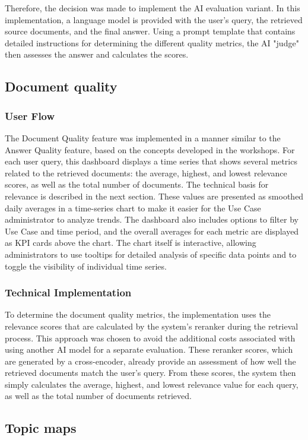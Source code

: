 \documentclass[
	english,
	ruledheaders=section,%
	class=report,%
	thesis={type=bachelor},%
	accentcolor=1b,%
	custommargins=true,%
	marginpar=false,%
	parskip=half-,%
	fontsize=11pt,%
	DIV=14,
]{tudapub}
\begin{document}
Therefore, the decision was made to implement the AI evaluation variant. In this implementation, a language model is provided with the user's query, the retrieved source documents, and the final answer. Using a prompt template that contains detailed instructions for determining the different quality metrics, the AI "judge" then assesses the answer and calculates the scores.
\subsection{Document quality}
\subsubsection{User Flow}
The Document Quality feature was implemented in a manner similar to the Answer Quality feature, based on the concepts developed in the workshops. For each user query, this dashboard displays a time series that shows several metrics related to the retrieved documents: the average, highest, and lowest relevance scores, as well as the total number of documents. The technical basis for relevance is described in the next section. These values are presented as smoothed daily averages in a time-series chart to make it easier for the Use Case administrator to analyze trends. The dashboard also includes options to filter by Use Case and time period, and the overall averages for each metric are displayed as KPI cards above the chart. The chart itself is interactive, allowing administrators to use tooltips for detailed analysis of specific data points and to toggle the visibility of individual time series.

\subsubsection{Technical Implementation}
To determine the document quality metrics, the implementation uses the relevance scores that are calculated by the system's reranker during the retrieval process. This approach was chosen to avoid the additional costs associated with using another AI model for a separate evaluation. These reranker scores, which are generated by a cross-encoder, already provide an assessment of how well the retrieved documents match the user's query. From these scores, the system then simply calculates the average, highest, and lowest relevance value for each query, as well as the total number of documents retrieved.
\subsection{Topic maps}
\end{document}
